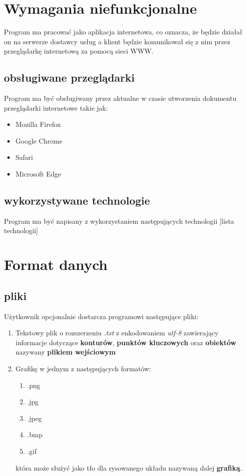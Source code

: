 \documentclass[hidelinks,10pt,a4paper]{article}
\newcommand\tab[1][0.5cm]{\hspace*{#1}}
\begin{document}
\section{Wymagania niefunkcjonalne}
\tab Program ma pracować jako aplikacja internetowa, co oznacza, że będzie działał on na serwerze dostawcy usług a klient będzie komunikował się z nim przez przeglądarkę internetową za pomocą sieci WWW.
\subsection{obsługiwane przeglądarki}
Program ma być obsługiwany przez aktualne w czasie utworzenia dokumentu  przeglądarki internetowe takie jak:
\begin{itemize}
\item Mozilla Firefox
\item Google Chrome
\item Safari
\item Microsoft Edge
\end{itemize}  
\subsection{wykorzystywane technologie}
Program ma być napisany z wykorzystaniem następujących technologii [lista technologii]




\section{Format danych}
\label{sec:daneWej}

\subsection{pliki}
Użytkownik opcjonalnie dostarcza programowi następujące pliki:
\begin{enumerate}
\item Tekstowy plik o rozszerzeniu \textit{.txt} z enkodowaniem \textit{utf-8} zawierający informacje dotyczące \textbf{konturów}, \textbf{punktów kluczowych} oraz \textbf{obiektów} nazywany \textbf{plikiem wejściowym}
\item Grafikę w jednym z następujących formatów: 
\begin{enumerate}
\item .png
\item .jpg
\item .jpeg
\item .bmp
\item .gif
\end{enumerate}
która może służyć jako tło dla rysowanego układu nazywaną dalej   \textbf{grafiką}.
\end{enumerate}
\end{document}
